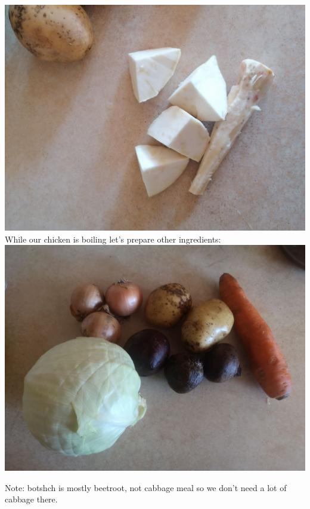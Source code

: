 \documentclass[11pt,a4paper]{article}
\begin{document}
\includegraphics[width=\textwidth]{4.jpg} \\


While our chicken is boiling let's prepare other ingredients:\\
\includegraphics[width=\textwidth]{3.jpg}

Note: botshch is mostly beetroot, not cabbage meal so we don't need a lot of cabbage there. \\
\end{document}
